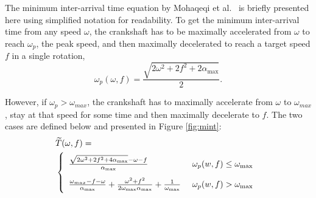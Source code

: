 The minimum inter-arrival time equation by Mohaqeqi et al.~\cite{mohaqeqi_refinement_2017} is briefly presented here using simplified notation for readability.
To get the minimum inter-arrival time from any speed $\omega$, the crankshaft has to be maximally accelerated from $\omega$ to reach $\omega_{p}$, the peak speed, and then maximally decelerated to reach a target speed $f$ in a single rotation,
\begin{equation}\label{eq:peakSpeed}
\omega_p(\omega,f) = \frac{\sqrt{2\omega^2 + 2f^2 + 2\alpha_{\max}}}{2}.
\end{equation}

However, if $\omega_{p}>\omega_{max}$, the crankshaft has to maximally accelerate from $\omega$ to $\omega_{max}$, stay at that speed for some time and then maximally decelerate to $f$.
The two cases are defined below and presented in Figure \ref{fig:mint}:
\begin{alignat}{3}\label{eq:minTime}
  &\widetilde{T}(\omega,f) = \\
  &\left\{
        \def\arraystretch{2.0}
        \begin{array}{ll}
            \frac{\sqrt{2\omega^2+2f^2+4\alpha_{\max}}-\omega-f}{\alpha_{\max}} & \ \omega_p(w,f) \leq \omega_{\max} \ \\
            \frac{\omega_{max} - f - \omega}{\alpha_{\max}} + \frac{\omega^2 + f^2}{2\omega_{\max}\alpha_{\max}}+\frac{1}{\omega_{\max}} & \ \omega_p(w,f) > \omega_{\max}
        \end{array}
    \right. \nonumber
\end{alignat}

